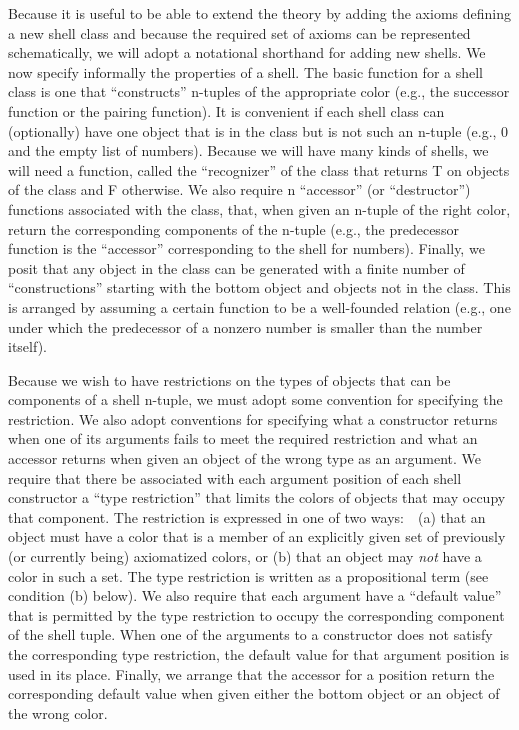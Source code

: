 \documentclass[10pt]{book}
\begin{document}
Because it is  useful to be able to extend the theory by
adding the axioms defining a new shell class and because the
required set of axioms can be  represented schematically, we will
adopt a notational shorthand for adding new shells.  We now specify informally
 the properties of a shell.  The basic
function for a shell class is one that ``constructs'' n-tuples of the appropriate
color  (e.g., the successor function
or the pairing function). It is convenient if each shell class can (optionally) have
one object that is in the class but is not such an n-tuple (e.g., 0 and the empty
list of numbers).  Because we will have many kinds of shells,
we will need a function, called the ``recognizer'' of the class that
returns T on objects of the class and F otherwise.  We also require n ``accessor'' (or ``destructor'') functions associated with the class, that,
when given an n-tuple of the right color,  return the corresponding
components of the n-tuple (e.g., the predecessor function is the ``accessor''
corresponding to the shell for numbers).  Finally, we posit that
any object in the class can be generated with a finite number of
``constructions'' starting with the bottom object and objects not
in the class.
This is arranged by assuming a certain function to be a well-founded relation
(e.g., one under which the predecessor of a
nonzero  number is smaller than the number itself).

Because we wish to have
restrictions on the types of objects that can be components of a shell n-tuple,
we must adopt some convention for specifying the restriction.
We also adopt conventions for specifying what a constructor returns when
one of its arguments fails to meet the required restriction and what
an accessor returns when given an object of the wrong type as an argument.  We require
that there be associated with each argument position of each shell constructor
a ``type restriction'' that limits the colors of objects that may occupy
that component.  The restriction is expressed in one of two ways:~~(a)
that an object must have a color that is a member of an explicitly given set of
previously (or currently being) axiomatized colors, or (b) that an object
may \emph{not} have a color in such a set.  The type restriction is written
as a propositional term (see condition (b) below).  We also require
that each argument have a ``default value'' that is permitted by the
type restriction to occupy the corresponding component of the shell tuple.
When one of the arguments to a constructor does not satisfy the corresponding
type restriction, the default value for that argument position is used in its place.
Finally, we  arrange  that
the accessor for a position return the corresponding
default value when given either the bottom object or an object of the wrong
color.
\end{document}
